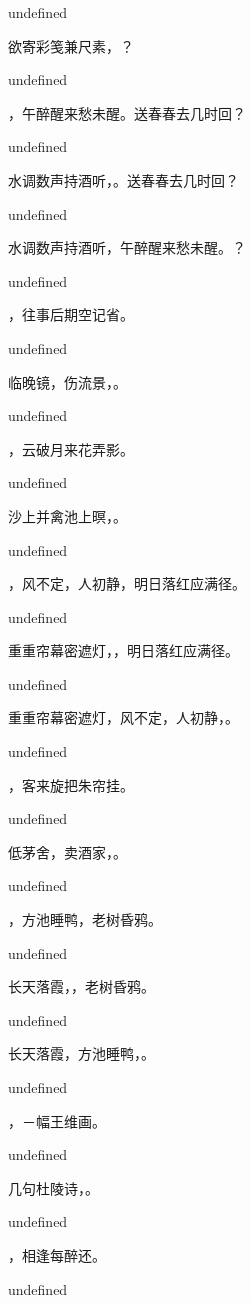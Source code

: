 \documentclass[12pt, a4paper, addpoints]{exam}
\begin{document}
\begin{questions}
undefined

\question[3] 欲寄彩笺兼尺素，\fillin？

undefined

\question[3] \fillin，午醉醒来愁未醒。送春春去几时回？

undefined

\question[3] 水调数声持酒听，\fillin。送春春去几时回？

undefined

\question[3] 水调数声持酒听，午醉醒来愁未醒。\fillin？

undefined

\question[3] \fillin，往事后期空记省。

undefined

\question[3] 临晚镜，伤流景，\fillin。

undefined

\question[3] \fillin，云破月来花弄影。

undefined

\question[3] 沙上并禽池上暝，\fillin。

undefined

\question[3] \fillin，风不定，人初静，明日落红应满径。

undefined

\question[3] 重重帘幕密遮灯，\fillin，明日落红应满径。

undefined

\question[3] 重重帘幕密遮灯，风不定，人初静，\fillin。

undefined

\question[3] \fillin，客来旋把朱帘挂。

undefined

\question[3] 低茅舍，卖酒家，\fillin。

undefined

\question[3] \fillin，方池睡鸭，老树昏鸦。

undefined

\question[3] 长天落霞，\fillin，老树昏鸦。

undefined

\question[3] 长天落霞，方池睡鸭，\fillin。

undefined

\question[3] \fillin，－幅王维画。

undefined

\question[3] 几句杜陵诗，\fillin。

undefined

\question[3] \fillin，相逢每醉还。

undefined


\end{questions}
\end{document}
